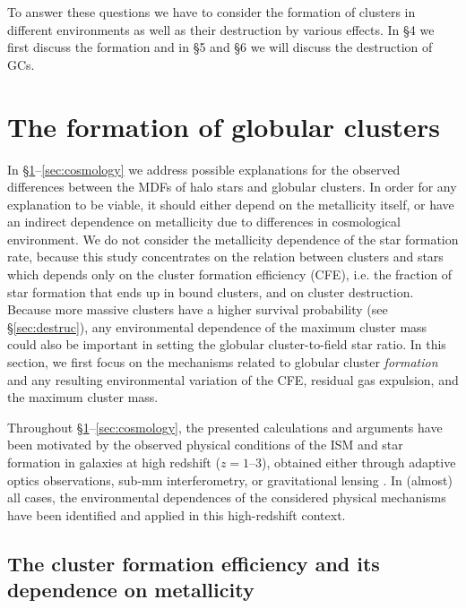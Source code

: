 \documentclass{aa}
\begin{document}
To answer these questions we have to consider the formation of clusters in different environments
as well as their destruction by various effects. In \S 4 we first discuss the formation and in 
\S 5 and \S 6 we will discuss the destruction of GCs.


\section{The formation of globular clusters} \label{sec:form}


In \S\ref{sec:form}--\ref{sec:cosmology} we address possible explanations 
for the observed differences
 between the MDFs of halo stars and globular clusters. In order for any explanation to be viable, it should either depend on the metallicity itself, or have an indirect dependence on metallicity due to differences in cosmological environment. We do not consider the metallicity dependence of the star formation rate, because this study concentrates on the relation between clusters and stars which depends only on the cluster formation efficiency (CFE), i.e. the fraction of star formation that ends up in bound clusters, and on cluster destruction. Because more massive clusters have a higher survival probability (see \S\ref{sec:destruc}), any environmental dependence of the maximum cluster mass could also be important in setting the globular cluster-to-field star ratio. In this section, we first focus on the mechanisms related to globular cluster {\it formation} and any resulting environmental variation of the CFE, residual gas expulsion, and the maximum cluster mass.
 
Throughout \S\ref{sec:form}--\ref{sec:cosmology}, the presented calculations and arguments have been motivated by the observed physical conditions of the ISM and star formation in galaxies at high redshift ($z=1$--$3$), obtained either through adaptive optics observations, sub-mm interferometry, or gravitational lensing \citep[e.g.][]{forsterschreiber09,genzel11,swinbank11,swinbank12,livermore15,dessauges17}. In (almost) all cases, the environmental dependences of the considered physical mechanisms have been identified and applied in this high-redshift context.


\subsection{The cluster formation efficiency and its dependence on metallicity} \label{sec:form:cfe}
\end{document}
